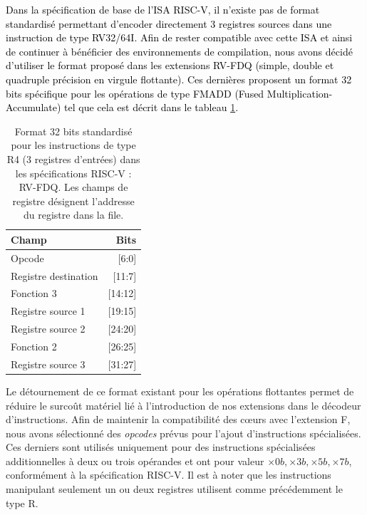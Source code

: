 \documentclass[../main.tex]{subfiles}
\begin{document}
\textcolor{black}{Dans la spécification de base de l'ISA RISC-V, il n'existe pas de format standardisé permettant d'encoder directement 3 registres sources dans une instruction de type RV32/64I.
Afin de rester compatible avec cette ISA et ainsi de continuer à bénéficier des environnements de compilation, nous avons décidé d'utiliser le format proposé dans les extensions RV-FDQ (simple, double et quadruple précision en virgule flottante).
Ces dernières proposent un format 32 bits spécifique pour les opérations de type FMADD (Fused Multiplication-Accumulate) tel que cela est décrit dans le tableau \ref{R4_instruction}.}



\begin{table}[]
    \centering
    \begin{tabular}{l|r}
        \toprule
         \textbf{Champ} & \textbf{Bits}  \\
         \bottomrule
         Opcode                 & [6:0]  \\
         Registre destination   & [11:7]  \\
         Fonction 3             & [14:12]  \\
         Registre source 1      & [19:15]  \\
         Registre source 2      & [24:20]  \\
         Fonction 2             & [26:25]  \\
         Registre source 3      & [31:27]  \\
        \bottomrule
    \end{tabular}
    \caption{Format 32 bits standardisé pour les instructions de type R4 (3 registres d'entrées) dans les spécifications RISC-V : RV-FDQ. Les champs de registre désignent l'addresse du registre dans la file.}
    \label{R4_instruction}
\end{table}
Le détournement de ce format existant pour les opérations flottantes permet de réduire le surcoût matériel lié à l'introduction de nos extensions dans le décodeur d'instructions.
Afin de maintenir la compatibilité des cœurs avec l'extension F, nous avons sélectionné des \textit{opcodes} prévus pour l'ajout d'instructions spécialisées.
Ces derniers sont utilisés uniquement pour des instructions spécialisées additionnelles à deux ou trois opérandes et ont pour valeur $\times0b, \times3b, \times5b, \times7b$, conformément à la spécification RISC-V.
Il est à noter que les instructions manipulant seulement un ou deux registres utilisent comme précédemment le type R.
\end{document}
